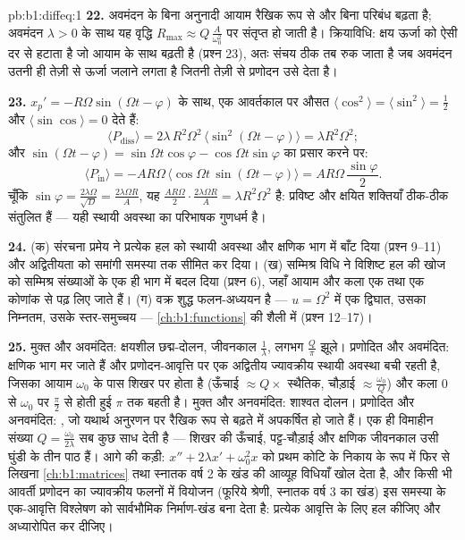 \begin{solution}{pb:b1:diffeq:1}
\textbf{22.} अवमंदन के बिना अनुनादी आयाम रैखिक रूप से और बिना परिबंध बढ़ता
है; अवमंदन $\lambda > 0$ के साथ यह वृद्धि $R_{\max} \approx Q\,\frac
A{\omega_0^2}$ पर संतृप्त हो जाती है। क्रियाविधि: क्षय ऊर्जा को ऐसी दर से
हटाता है जो आयाम के साथ बढ़ती है (प्रश्न 23), अतः संचय ठीक तब रुक जाता है जब
अवमंदन उतनी ही तेज़ी से ऊर्जा जलाने लगता है जितनी तेज़ी से प्रणोदन उसे देता
है।

\textbf{23.} $x_p' = -R\Omega\sin(\Omega t - \varphi)$ के साथ, एक आवर्तकाल
पर औसत $\langle\cos^2\rangle = \langle\sin^2\rangle = \frac12$ और
$\langle\sin\cos\rangle = 0$ देते हैं:
\[
\langle P_{\mathrm{diss}}\rangle
= 2\lambda\,R^2\Omega^2\,\langle\sin^2(\Omega t -
\varphi)\rangle = \lambda R^2\Omega^2 ;
\]
और $\sin(\Omega t - \varphi) = \sin\Omega t\cos\varphi - \cos\Omega
t\sin\varphi$ का प्रसार करने पर:
\[
\langle P_{\mathrm{in}}\rangle
= -AR\Omega\,\bigl\langle\cos\Omega t\,\sin(\Omega t -
\varphi)\bigr\rangle
= AR\Omega\,\frac{\sin\varphi}2 .
\]
चूँकि $\sin\varphi = \frac{2\lambda\Omega}{\sqrt D} = \frac{2\lambda\Omega
R}A$, यह $\frac{AR\Omega}2 \cdot \frac{2\lambda\Omega R}A = \lambda
R^2\Omega^2$ है: प्रविष्ट और क्षयित शक्तियाँ ठीक-ठीक संतुलित हैं --- यही
स्थायी अवस्था का परिभाषक गुणधर्म है।

\textbf{24.} (क) संरचना प्रमेय ने प्रत्येक हल को स्थायी अवस्था और क्षणिक भाग
में बाँट दिया (प्रश्न 9--11) और अद्वितीयता को समांगी समस्या तक सीमित कर
दिया। (ख) सम्मिश्र विधि ने विशिष्ट हल की खोज को सम्मिश्र संख्याओं के एक ही
भाग में बदल दिया (प्रश्न 6), जहाँ आयाम और कला एक  तथा एक कोणांक से पढ़
लिए जाते हैं। (ग)  वक्र शुद्ध फलन-अध्ययन है --- $u = \Omega^2$ में एक
द्विघात, उसका निम्नतम, उसके स्तर-समुच्चय --- \cref{ch:b1:functions} की शैली
में (प्रश्न 12--17)।

\textbf{25.} मुक्त और अवमंदित: क्षयशील छद्म-दोलन, जीवनकाल $\frac1\lambda$,
लगभग $\frac Q\pi$ झूले। प्रणोदित और अवमंदित: क्षणिक भाग मर जाते हैं और
प्रणोदन-आवृत्ति पर एक अद्वितीय ज्यावक्रीय स्थायी अवस्था बची रहती है, जिसका
आयाम $\omega_0$ के पास शिखर पर होता है (ऊँचाई $\approx Q \times$ स्थैतिक,
चौड़ाई $\approx \frac{\omega_0}Q$) और कला $0$ से $\omega_0$ पर $\frac\pi2$
से होती हुई $\pi$ तक बहती है। मुक्त और अनवमंदित: शाश्वत दोलन। प्रणोदित और
अनवमंदित: , जो यथार्थ अनुरणन पर रैखिक रूप से बढ़ते  में
अपकर्षित हो जाते हैं। एक ही विमाहीन संख्या $Q = \frac{\omega_0}{2\lambda}$
सब कुछ साध देती है --- शिखर की ऊँचाई, पट्ट-चौड़ाई और क्षणिक जीवनकाल उसी
घुंडी के तीन पाठ हैं। आगे की कड़ी: $x'' + 2\lambda x' + \omega_0^2x$ को
प्रथम कोटि के निकाय के रूप में फिर से लिखना \cref{ch:b1:matrices} तथा स्नातक
वर्ष 2 के खंड की आव्यूह विधियाँ खोल देता है, और किसी भी आवर्ती प्रणोदन का
ज्यावक्रीय फलनों में वियोजन (फूरिये श्रेणी, स्नातक वर्ष 3 का खंड) इस समस्या
के एक-आवृत्ति विश्लेषण को सार्वभौमिक निर्माण-खंड बना देता है: प्रत्येक
आवृत्ति के लिए हल कीजिए और अध्यारोपित कर दीजिए।
\end{solution}
